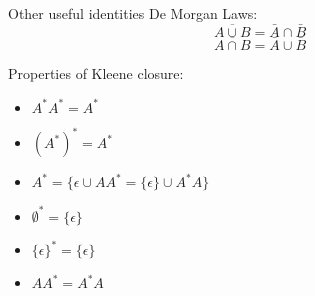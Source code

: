 \documentclass[style=sailor,size=12pt]{powerdot}
\begin{document}
\begin{slide}[bm=,toc=]{Other useful identities}
De Morgan Laws:
\[
\overline{A \cup B} = \bar{A} \cap \bar{B}  
\]
\[
\overline{A \cap B} = \bar{A} \cup \bar{B}  
\]

Properties of Kleene closure:
\begin{itemize}
\item $A^*A^* = A^*$
\item $(A^*)^* = A^*$
\item $A^* = \{\epsilon \cup AA^* = \{\epsilon\}\cup A^*A \}$
\item $\emptyset^* = \{\epsilon\}$ 
\item $\{\epsilon\}^* = \{\epsilon\}$ 
\item $AA^* = A^*A$ 
\end{itemize}
\end{slide}
\end{document}
